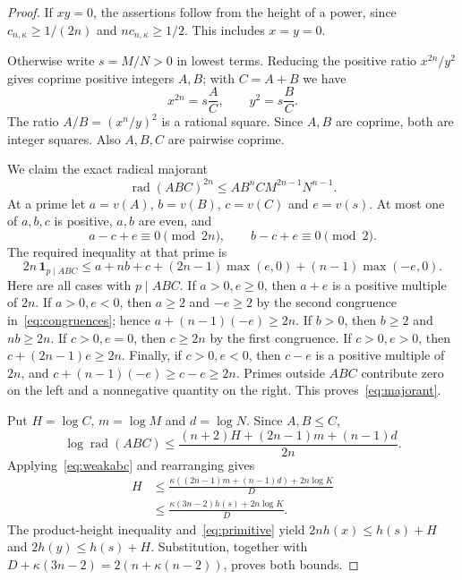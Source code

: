 \documentclass[11pt]{article}
\newcommand{\rad}{\operatorname{rad}}
\begin{document}
\begin{proof}
If $xy=0$, the assertions follow from the height of a power, since
$c_{n,\kappa}\ge1/(2n)$ and $n c_{n,\kappa}\ge1/2$.
This includes $x=y=0$.

Otherwise write $s=M/N>0$ in lowest terms. Reducing the positive
ratio $x^{2n}/y^2$ gives coprime positive integers $A,B$; with
$C=A+B$ we have
\begin{equation}\label{eq:primitive}
 x^{2n}=s\frac AC,\qquad y^2=s\frac BC.
\end{equation}
The ratio $A/B=(x^n/y)^2$ is a rational square. Since $A,B$ are
coprime, both are integer squares. Also $A,B,C$ are pairwise coprime.

We claim the exact radical majorant
\begin{equation}\label{eq:majorant}
 \rad(ABC)^{2n}\le A B^n C M^{2n-1}N^{n-1}.
\end{equation}
At a prime let $a=v(A)$, $b=v(B)$, $c=v(C)$ and $e=v(s)$.
At most one of $a,b,c$ is positive, $a,b$ are even, and
\begin{equation}\label{eq:congruences}
 a-c+e\equiv0\pmod{2n},\qquad b-c+e\equiv0\pmod2.
\end{equation}
The required inequality at that prime is
\[
 2n\,\boldsymbol1_{p\mid ABC}
 \le a+nb+c+(2n-1)\max(e,0)+(n-1)\max(-e,0).
\]
Here are all cases with $p\mid ABC$.
If $a>0,e\ge0$, then $a+e$ is a positive multiple of $2n$.
If $a>0,e<0$, then $a\ge2$ and $-e\ge2$ by the second
congruence in~\eqref{eq:congruences}; hence
$a+(n-1)(-e)\ge2n$.
If $b>0$, then $b\ge2$ and $nb\ge2n$.
If $c>0,e=0$, then $c\ge2n$ by the first congruence.
If $c>0,e>0$, then $c+(2n-1)e\ge2n$.
Finally, if $c>0,e<0$, then $c-e$ is a positive multiple of
$2n$, and
$c+(n-1)(-e)\ge c-e\ge2n$.
Primes outside $ABC$ contribute zero on the left and a nonnegative
quantity on the right. This proves~\eqref{eq:majorant}.

Put $H=\log C$, $m=\log M$ and $d=\log N$. Since $A,B\le C$,
\[
 \log\rad(ABC)
 \le\frac{(n+2)H+(2n-1)m+(n-1)d}{2n}.
\]
Applying~\eqref{eq:weakabc} and rearranging gives
\begin{align*}
 H&\le
 \frac{\kappa((2n-1)m+(n-1)d)+2n\log K}{D}\\
 &\le\frac{\kappa(3n-2)h(s)+2n\log K}{D}.
\end{align*}
The product-height inequality and~\eqref{eq:primitive} yield
$2n h(x)\le h(s)+H$ and $2h(y)\le h(s)+H$.
Substitution, together with
$D+\kappa(3n-2)=2(n+\kappa(n-2))$,
proves both bounds.
\end{proof}
\end{document}
